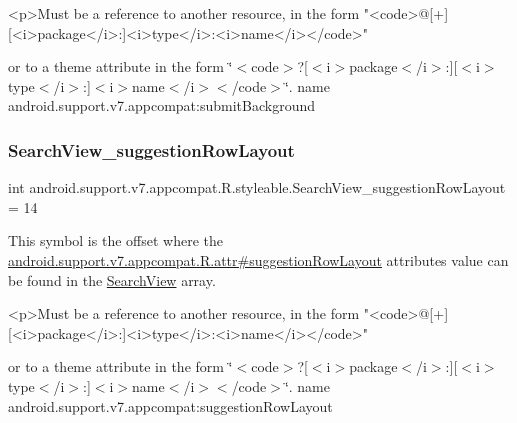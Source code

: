 \begin{DoxyVerb}      <p>Must be a reference to another resource, in the form "<code>@[+][<i>package</i>:]<i>type</i>:<i>name</i></code>"
\end{DoxyVerb}
 or to a theme attribute in the form \char`\"{}$<$code$>$?\mbox{[}$<$i$>$package$<$/i$>$\+:\mbox{]}\mbox{[}$<$i$>$type$<$/i$>$\+:\mbox{]}$<$i$>$name$<$/i$>$$<$/code$>$\char`\"{}.  name android.\+support.\+v7.\+appcompat\+:submit\+Background \mbox{\label{classandroid_1_1support_1_1v7_1_1appcompat_1_1R_1_1styleable_a721bc13b98ace8002519af52fdaf8a26}} 
\subsubsection{\texorpdfstring{Search\+View\+\_\+suggestion\+Row\+Layout}{SearchView\_suggestionRowLayout}}
{\footnotesize\ttfamily int android.\+support.\+v7.\+appcompat.\+R.\+styleable.\+Search\+View\+\_\+suggestion\+Row\+Layout = 14\hspace{0.3cm}{\ttfamily [static]}}

This symbol is the offset where the \hyperlink{classandroid_1_1support_1_1v7_1_1appcompat_1_1R_1_1attr_a0ee770ca62d467ea8536270fe48d2bb2}{android.\+support.\+v7.\+appcompat.\+R.\+attr\#suggestion\+Row\+Layout} attribute\textquotesingle{}s value can be found in the \hyperlink{classandroid_1_1support_1_1v7_1_1appcompat_1_1R_1_1styleable_a01af09df9e38f1e4f57165c3d3cee9fe}{Search\+View} array.

\begin{DoxyVerb}      <p>Must be a reference to another resource, in the form "<code>@[+][<i>package</i>:]<i>type</i>:<i>name</i></code>"
\end{DoxyVerb}
 or to a theme attribute in the form \char`\"{}$<$code$>$?\mbox{[}$<$i$>$package$<$/i$>$\+:\mbox{]}\mbox{[}$<$i$>$type$<$/i$>$\+:\mbox{]}$<$i$>$name$<$/i$>$$<$/code$>$\char`\"{}.  name android.\+support.\+v7.\+appcompat\+:suggestion\+Row\+Layout \mbox{\label{classandroid_1_1support_1_1v7_1_1appcompat_1_1R_1_1styleable_ab659f692825b4cff1b7e0b64a992de3d}} 
